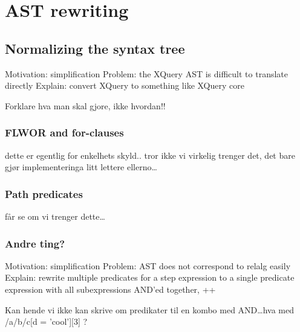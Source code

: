 \section{AST rewriting}
\subsection{Normalizing the syntax tree}
Motivation: simplification
Problem: the XQuery AST is difficult to translate directly
Explain: convert XQuery to something like XQuery core

Forklare hva man skal gjore, ikke hvordan!!

\subsubsection{FLWOR and for-clauses}
dette er egentlig for enkelhets skyld.. tror ikke vi virkelig trenger det, det bare gj\o r implementeringa litt
lettere ellerno\ldots
\subsubsection{Path predicates}
f\aa r se om vi trenger dette\ldots
\subsubsection{Andre ting?}
 
Motivation: simplification
Problem: AST does not correspond to relalg easily
Explain: rewrite multiple predicates for a step expression to a single 
         predicate expression with all subexpressions AND'ed together, ++
         
Kan hende vi ikke kan skrive om predikater til en kombo med AND\ldots hva med
/a/b/c[d = 'cool'][3] ?
